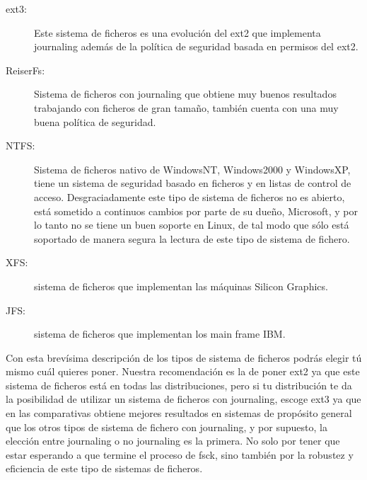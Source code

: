 \begin{description}

\item[ext3:] Este sistema  de ficheros es  una evolución del  ext2 que
implementa journaling  además de  la política  de seguridad  basada en
permisos del ext2.

\item[ReiserFs:] Sistema de  ficheros con  journaling que  obtiene muy
buenos  resultados trabajando  con  ficheros de  gran tamaño,  también
cuenta con una muy buena política de seguridad.

\item[NTFS:] Sistema de  ficheros nativo  de WindowsNT,  Windows2000 y
WindowsXP,  tiene un  sistema de  seguridad  basado en  ficheros y  en
listas de control de acceso.  Desgraciadamente este tipo de sistema de
ficheros no es abierto, está sometido a continuos cambios por parte de
su dueño,  Microsoft, y por  lo tanto no se  tiene un buen  soporte en
Linux, de tal modo que sólo está soportado de manera segura la lectura
de este tipo de sistema de fichero.

\item[XFS:] sistema de  ficheros que implementan las  máquinas Silicon
Graphics.

\item[JFS:] sistema de ficheros que implementan los main frame IBM.

\end{description}

Con esta  brevísima descripción  de los tipos  de sistema  de ficheros
podrás elegir tú mismo cuál quieres poner. Nuestra recomendación es la
de  poner ext2  ya que  este  sistema de  ficheros está  en todas  las
distribuciones,  pero  si tu  distribución  te  da la  posibilidad  de
utilizar un sistema de ficheros con  journaling, escoge ext3 ya que en
las comparativas  obtiene mejores resultados en  sistemas de propósito
general que  los otros tipos de  sistema de fichero con  journaling, y
por  supuesto, la  elección entre  journaling  o no  journaling es  la
primera.  No solo  por  tener que  estar esperando  a  que termine  el
proceso de  fsck, sino también  por la  robustez y eficiencia  de este
tipo de sistemas de ficheros.

